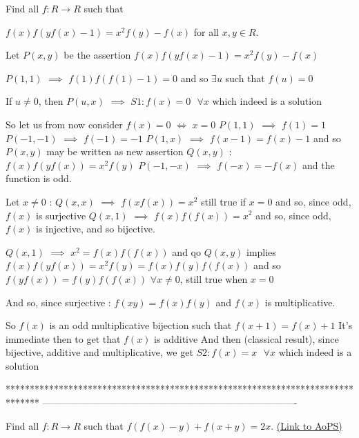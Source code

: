 \begin{solution}
	\begin{tcolorbox}Find all $f:R \rightarrow R$ such that

$f(x)f(yf(x)-1)=x^2f(y)-f(x)$ for all $x,y \in R$.\end{tcolorbox}
Let $P(x,y)$ be the assertion $f(x)f(yf(x)-1)=x^2f(y)-f(x)$

$P(1,1)$ $\implies$ $f(1)f(f(1)-1)=0$ and so $\exists u$ such that $f(u)=0$

If $u\ne 0$, then $P(u,x)$ $\implies$ $\boxed{S1: f(x)=0\text{  }\forall x}$ which indeed is a solution

So let us from now consider $f(x)=0$ $\iff$ $x=0$
$P(1,1)$ $\implies$ $f(1)=1$
$P(-1,-1)$ $\implies$ $f(-1)=-1$
$P(1,x)$ $\implies$ $f(x-1)=f(x)-1$ and so $P(x,y)$ may be written as new assertion $Q(x,y)$ : $f(x)f(yf(x))=x^2f(y)$
$P(-1,-x)$ $\implies$ $f(-x)=-f(x)$ and the function is odd.

Let $x\ne 0$ : $Q(x,x)$ $\implies$ $f(xf(x))=x^2$ still true if $x=0$ and so, since odd, $f(x)$ is surjective 
$Q(x,1)$ $\implies$ $f(x)f(f(x))=x^2$ and so, since odd, $f(x)$ is injective, and so bijective.

$Q(x,1)$ $\implies$ $x^2=f(x)f(f(x))$ and qo $Q(x,y)$ implies $f(x)f(yf(x))=x^2f(y)=f(x)f(y)f(f(x))$ and so $f(yf(x))=f(y)f(f(x))$ $\forall x\ne 0$, still true when $x=0$

And  so, since surjective : $f(xy)=f(x)f(y)$ and $f(x)$ is multiplicative.

So $f(x)$ is an odd multiplicative bijection such that $f(x+1)=f(x)+1$
It's immediate then to get that $f(x)$ is additive
And then (classical result), since bijective, additive and multiplicative, we get $\boxed{S2: f(x)=x\text{  }\forall x}$ which indeed is a solution
\end{solution}
*******************************************************************************
-------------------------------------------------------------------------------

\begin{problem}
	Find all $f:R \rightarrow R $ such that
$f(f(x)-y)+f(x+y)=2x.$
	\flushright \href{https://artofproblemsolving.com/community/c6h584184}{(Link to AoPS)}
\end{problem}



